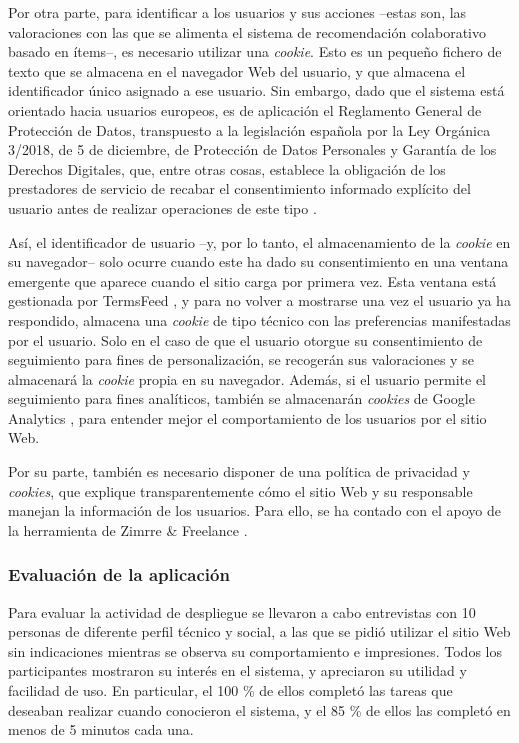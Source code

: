 Por otra parte, para identificar a los usuarios y sus acciones –estas son, las valoraciones con las que se alimenta el sistema de recomendación colaborativo basado en ítems–, es necesario utilizar una \textit{cookie}. Esto es un pequeño fichero de texto que se almacena en el navegador Web del usuario, y que almacena el identificador único asignado a ese usuario. Sin embargo, dado que el sistema está orientado hacia usuarios europeos, es de aplicación el Reglamento General de Protección de Datos, transpuesto a la legislación española por la Ley Orgánica 3/2018, de 5 de diciembre, de Protección de Datos Personales y Garantía de los Derechos Digitales, que, entre otras cosas, establece la obligación de los prestadores de servicio de recabar el consentimiento informado explícito del usuario antes de realizar operaciones de este tipo \cite{GDPR_ESP}.

Así, el identificador de usuario –y, por lo tanto, el almacenamiento de la \textit{cookie} en su navegador– solo ocurre cuando este ha dado su consentimiento en una ventana emergente que aparece cuando el sitio carga por primera vez. Esta ventana está gestionada por TermsFeed \cite{TermsFeed}, y para no volver a mostrarse una vez el usuario ya ha respondido, almacena una \textit{cookie} de tipo técnico con las preferencias manifestadas por el usuario. Solo en el caso de que el usuario otorgue su consentimiento de seguimiento para fines de personalización, se recogerán sus valoraciones y se almacenará la \textit{cookie} propia en su navegador. Además, si el usuario permite el seguimiento para fines analíticos, también se almacenarán \textit{cookies} de Google Analytics \cite{analytics}, para entender mejor el comportamiento de los usuarios por el sitio Web.

Por su parte, también es necesario disponer de una política de privacidad y \textit{cookies}, que explique transparentemente cómo el sitio Web y su responsable manejan la información de los usuarios. Para ello, se ha contado con el apoyo de la herramienta de Zimrre \& Freelance \cite{privacidad}.

\subsubsection{Evaluación de la aplicación}

Para evaluar la actividad de despliegue se llevaron a cabo entrevistas con 10 personas de diferente perfil técnico y social, a las que se pidió utilizar el sitio Web sin indicaciones mientras se observa su comportamiento e impresiones. Todos los participantes mostraron su interés en el sistema, y apreciaron su utilidad y facilidad de uso. En particular, el 100 \% de ellos completó las tareas que deseaban realizar cuando conocieron el sistema, y el 85 \% de ellos las completó en menos de 5 minutos cada una.

